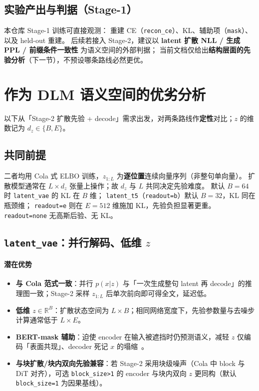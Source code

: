 \documentclass[UTF8,a4paper,11pt]{ctexart}
\begin{document}
\subsection{实验产出与判据（Stage-1）}

本仓库 Stage-1 训练可直接观测：
重建 CE（\texttt{recon\_ce}）、KL、辅助项（\texttt{mask}）、以及 held-out 重建。
后续若接入 Stage-2，建议以 \textbf{latent 扩散 NLL / 生成 PPL / 前缀条件一致性} 为语义空间的外部判据；
当前文档仅给出\textbf{结构层面的先验分析}（下一节），不预设哪条路线必然更优。

\section{作为 DLM 语义空间的优劣分析}
\label{sec:dlm-space}

以下从「Stage-2 扩散先验 + decode」需求出发，对两条路线作\textbf{定性}对比；$z$ 的维数记为 $d_z\in\{B,E\}$。

\subsection{共同前提}

二者均用 Cola 式 ELBO 训练，$z_{1:L}$ 为\textbf{逐位置}连续向量序列（非整句单向量）。
扩散模型通常在 $L\times d_z$ 张量上操作；故 $d_z$ 与 $L$ 共同决定先验难度。
默认 $B{=}64$ 时 \texttt{latent\_vae} 的 KL 在 $B$ 维；
\texttt{latent\_t5}（\texttt{readout=b}）默认 $B{=}32$，KL 同在瓶颈维；
\texttt{readout=e} 则在 $E{=}512$ 维施加 KL，先验负担显著更重。
\texttt{readout=none} 无高斯后验、无 KL。

\subsection{\texttt{latent\_vae}：并行解码、低维 $z$}

\paragraph{潜在优势}
\begin{itemize}
  \item \textbf{与 Cola 范式一致}：并行 $p(x|z)$ 与「一次生成整句 latent 再 decode」的推理图一致；Stage-2 采样 $z_{1:L}$ 后单次前向即可得全文，延迟低。
  \item \textbf{低维 $z\in\mathbb{R}^B$}：扩散状态空间为 $L{\times}B$；相同网络宽度下，先验参数量与去噪步计算通常低于 $L{\times}E$。
  \item \textbf{BERT-mask 辅助}：迫使 encoder 在输入被遮挡时仍预测语义，减轻 $z$ 仅编码「表面共现」、decoder 死记 $x$ 的塌缩~\cite{devlin2019bert}。
  \item \textbf{与块扩散/块内双向先验兼容}：若 Stage-2 采用块级噪声（Cola 中 block 与 DiT 对齐），可选 \texttt{block\_size>1} 的 encoder 与块内双向 $z$ 更同构（默认 \texttt{block\_size=1} 为因果基线）。
\end{itemize}
\end{document}
